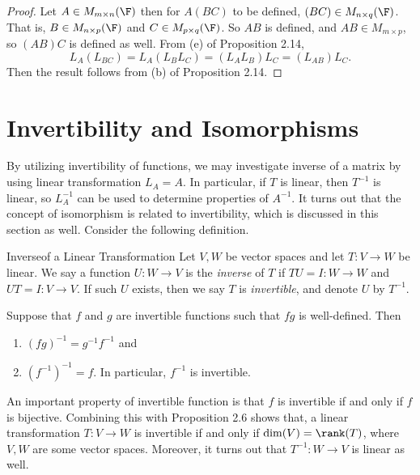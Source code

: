 \documentclass[linearalgebra]{subfiles}
\begin{document}
    \begin{proof}
        Let $A\in M_{m\times n}(\F)$ then for $A(BC)$ to be defined, $(BC)\in M_{n\times q}(\F)$. That is, $B\in M_{n\times p}(\F)$ and $C\in M_{p\times q}(\F)$. So $AB$ is defined, and $AB\in M_{m\times p}$, so $(AB)C$ is defined as well. From (e) of Proposition 2.14,
        \begin{equation*}
            L_A(L_{BC}) = L_A(L_BL_C) = (L_AL_B)L_C = (L_{AB})L_C.
        \end{equation*}
        Then the result follows from (b) of Proposition 2.14.
    \end{proof}

    \section{Invertibility and Isomorphisms}

    \begin{remark}
        By utilizing invertibility of functions, we may investigate inverse of a matrix by using linear transformation $L_A = A$. In particular, if $T$ is linear, then $T^{-1}$ is linear, so $L_A^{-1}$ can be used to determine properties of $A^{-1}$. It turns out that the concept of isomorphism is related to invertibility, which is discussed in this section as well. Consider the following definition.
    \end{remark}

    \begin{definition}{Inverse}{of a Linear Transformation}
        Let $V, W$ be vector spaces and let $T:V\to W$ be linear. We say a function $U:W\to V$ is the \emph{inverse} of $T$ if $TU=I:W\to W$ and $UT=I:V\to V$. If such $U$ exists, then we say $T$ is \emph{invertible}, and denote $U$ by $T^{-1} $.
    \end{definition}

    \begin{remark}
        Suppose that $f$ and $g$ are invertible functions such that $fg$ is well-defined. Then
        \begin{enumerate}
            \item $\left( fg \right) ^{-1} = g^{-1} f^{-1} $ and
            \item $\left( f^{-1}  \right) ^{-1} = f$. In particular, $f^{-1} $ is invertible.
        \end{enumerate}
        An important property of invertible function is that $f$ is invertible if and only if $f$ is bijective. Combining this with Proposition 2.6 shows that, a linear transformation $T:V\to W$ is invertible if and only if $\dim(V)=\rank(T)$, where $V, W$ are some vector spaces. Moreover, it turns out that $T^{-1}:W\to V$ is linear as well.
    \end{remark}
\end{document}
